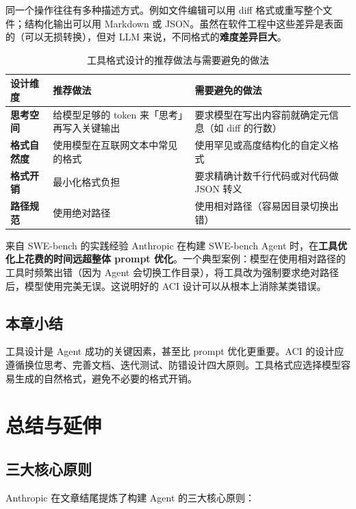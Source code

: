 \documentclass[a4paper]{article}
\begin{document}
同一个操作往往有多种描述方式。例如文件编辑可以用 diff 格式或重写整个文件；结构化输出可以用 Markdown 或 JSON。虽然在软件工程中这些差异是表面的（可以无损转换），但对 LLM 来说，不同格式的\textbf{难度差异巨大}。

\begin{table}[H]
\centering
\begin{tabular}{>{\bfseries}p{3cm} p{4.5cm} p{4.5cm}}
\toprule
设计维度 & 推荐做法 & 需要避免的做法 \\
\midrule
思考空间 & 给模型足够的 token 来「思考」再写入关键输出 & 要求模型在写出内容前就确定元信息（如 diff 的行数） \\
格式自然度 & 使用模型在互联网文本中常见的格式 & 使用罕见或高度结构化的自定义格式 \\
格式开销 & 最小化格式负担 & 要求精确计数千行代码或对代码做 JSON 转义 \\
路径规范 & 使用绝对路径 & 使用相对路径（容易因目录切换出错） \\
\bottomrule
\end{tabular}
\caption{工具格式设计的推荐做法与需要避免的做法}
\end{table}

\begin{knowledgebox}{来自 SWE-bench 的实践经验}
Anthropic 在构建 SWE-bench Agent 时，在\textbf{工具优化上花费的时间远超整体 prompt 优化}。一个典型案例：模型在使用相对路径的工具时频繁出错（因为 Agent 会切换工作目录），将工具改为强制要求绝对路径后，模型使用完美无误。这说明好的 ACI 设计可以从根本上消除某类错误。
\end{knowledgebox}

\subsection{本章小结}
工具设计是 Agent 成功的关键因素，甚至比 prompt 优化更重要。ACI 的设计应遵循换位思考、完善文档、迭代测试、防错设计四大原则。工具格式应选择模型容易生成的自然格式，避免不必要的格式开销。


\section{总结与延伸}

\subsection{三大核心原则}

Anthropic 在文章结尾提炼了构建 Agent 的三大核心原则：
\end{document}
